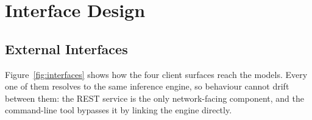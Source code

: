 \section{Interface Design}
\label{sec:interface}

\subsection{External Interfaces}
\label{subsec:extinterface}

Figure~\ref{fig:interfaces} shows how the four client surfaces reach the
models. Every one of them resolves to the same inference engine, so behaviour
cannot drift between them: the REST service is the only network-facing
component, and the command-line tool bypasses it by linking the engine
directly.


